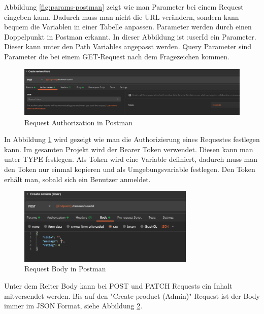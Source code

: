 Abbildung \ref{fig:params-postman} zeigt wie man Parameter bei einem Request eingeben kann. Dadurch muss man nicht die URL verändern, sondern kann bequem die Variablen in einer Tabelle anpassen. Parameter werden durch einen Doppelpunkt in Postman erkannt. In dieser Abbildung ist :userId ein Parameter. Dieser kann unter den Path Variables angepasst werden. Query Parameter sind Parameter die bei einem GET-Request nach dem Fragezeichen kommen.

\begin{figure}[H]
 \centering
 \includegraphics[width=\textwidth,height=0.6\textheight,keepaspectratio]{images/Postman_token.png}
 \caption{Request Authorization in Postman}
 \label{fig:authorization-postman}
\end{figure}

In Abbildung \ref{fig:authorization-postman} wird gezeigt wie man die Authorizierung eines Requestes festlegen kann. Im gesamten Projekt wird der Bearer Token verwendet. Diesen kann man unter TYPE festlegen. Als Token wird eine Variable definiert, dadurch muss man den Token nur einmal kopieren und als Umgebungsvariable festlegen. Den Token erhält man, sobald sich ein Benutzer anmeldet.

\begin{figure}[H]
 \centering
 \includegraphics[width=0.75\textwidth,height=0.6\textheight,keepaspectratio]{images/Postman_body.png}
 \caption{Request Body in Postman}
 \label{fig:body-postman}
\end{figure}

Unter dem Reiter Body kann bei POST und PATCH Requests ein Inhalt mitversendet werden. Bis auf den "Create product (Admin)" Request ist der Body immer im JSON Format, siehe Abbildung \ref{fig:body-postman}.
